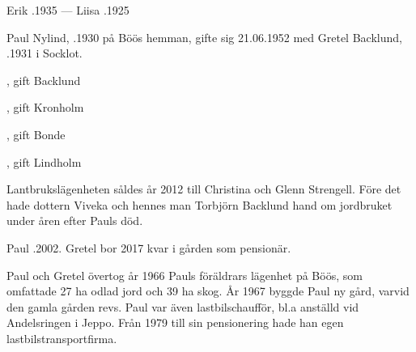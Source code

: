Erik .1935  ---  Liisa .1925



%



%
Paul Nylind, .1930 på Böös hemman, gifte sig 21.06.1952 med Gretel Backlund, .1931 i Socklot.
\begin{jhchildren}
  \item {}, gift Backlund
  \item {}, gift Kronholm
  \item {}, gift Bonde
  \item {}, gift Lindholm
\end{jhchildren}
Lantbrukslägenheten såldes år 2012 till Christina och Glenn Strengell. Före det hade dottern Viveka och hennes man Torbjörn Backlund hand om jordbruket under åren efter Pauls död.

Paul .2002. Gretel bor 2017 kvar i gården som pensionär.


%
Paul och Gretel övertog år 1966 Pauls föräldrars lägenhet på Böös, som omfattade 27 ha odlad jord och 39 ha skog. År 1967 byggde Paul ny gård, varvid den gamla gården revs. Paul var även lastbilschaufför, bl.a anställd vid Andelsringen i Jeppo. Från 1979 till sin pensionering hade han egen lastbilstransportfirma.


%



